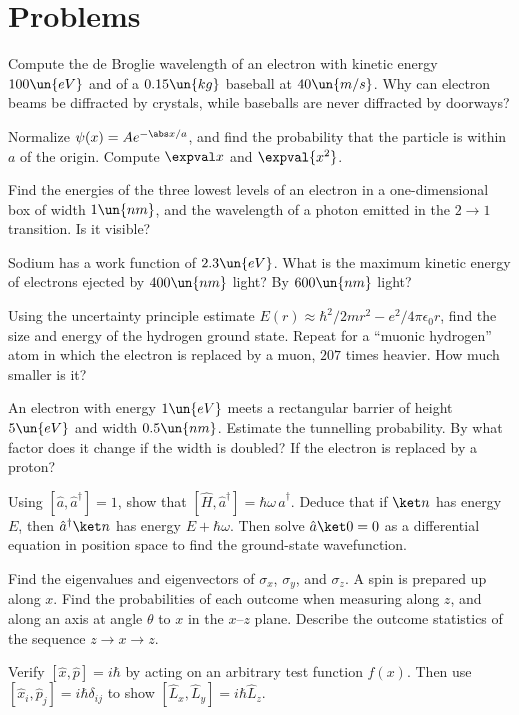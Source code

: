 \section{Problems}

\begin{problems}
\core Compute the de Broglie wavelength of an electron with kinetic energy $100\un{eV}$ and of a $0.15\un{kg}$ baseball at $40\un{m/s}$. Why can electron beams be diffracted by crystals, while baseballs are never diffracted by doorways?

 Normalize $\psi(x) = Ae^{-\abs x/a}$, and find the probability that the particle is within $a$ of the origin. Compute $\expval x$ and $\expval{x^2}$.

 Find the energies of the three lowest levels of an electron in a one-dimensional box of width $1\un{nm}$, and the wavelength of a photon emitted in the $2\to1$ transition. Is it visible?

 Sodium has a work function of $2.3\un{eV}$. What is the maximum kinetic energy of electrons ejected by $400\un{nm}$ light? By $600\un{nm}$ light?

\core Using the uncertainty principle estimate $E(r)\approx\hbar^2/2mr^2 - e^2/4\pi\epsilon_0r$, find the size and energy of the hydrogen ground state. Repeat for a ``muonic hydrogen'' atom in which the electron is replaced by a muon, $207$ times heavier. How much smaller is it?

 An electron with energy $1\un{eV}$ meets a rectangular barrier of height $5\un{eV}$ and width $0.5\un{nm}$. Estimate the tunnelling probability. By what factor does it change if the width is doubled? If the electron is replaced by a proton?

\core Using $[\hat a,\hat a^\dagger] = 1$, show that $[\hat H,\hat a^\dagger] = \hbar\omega\,\hat a^\dagger$. Deduce that if $\ket n$ has energy $E$, then $\hat a^\dagger\ket n$ has energy $E+\hbar\omega$. Then solve $\hat a\ket0 = 0$ as a differential equation in position space to find the ground-state wavefunction.

 Find the eigenvalues and eigenvectors of $\sigma_x$, $\sigma_y$, and $\sigma_z$. A spin is prepared up along $x$. Find the probabilities of each outcome when measuring along $z$, and along an axis at angle $\theta$ to $x$ in the $x$--$z$ plane. Describe the outcome statistics of the sequence $z\to x\to z$.

\core Verify $[\hat x,\hat p] = i\hbar$ by acting on an arbitrary test function $f(x)$. Then use $[\hat x_i,\hat p_j] = i\hbar\delta_{ij}$ to show $[\hat L_x,\hat L_y] = i\hbar\hat L_z$.


\end{problems}
